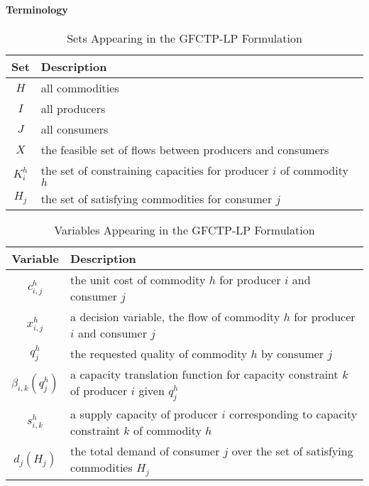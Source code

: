 \paragraph{Terminology}

\begin{table} [h!]
\centering
\begin{tabularx}{\columnwidth-10pt}{|c|X|} %
\hline
Set         & Description \\
\hline
$H$         & all commodities  \\
$I$         & all producers  \\
$J$         & all consumers  \\
$X$         & the feasible set of flows between producers and consumers  \\
$K_{i}^{h}$  & the set of constraining capacities for 
            producer $i$ of commodity $h$  \\
$H_{j}$     & the set of satisfying commodities for consumer $j$  \\
\hline
\end{tabularx}
\caption{Sets Appearing in the GFCTP-LP Formulation}
\label{tbl:GFCTP-LP-sets}
\end{table}

\begin{table} [h!]
\centering
\begin{tabularx}{\columnwidth-10pt}{|c|X|} %
\hline
Variable    & Description \\
\hline
$c_{i,j}^{h}$             & the unit cost of commodity $h$ 
                          for producer $i$ and consumer $j$  \\
$x_{i,j}^{h}$             & a decision variable, the flow of commodity $h$ 
                          for producer $i$ and consumer $j$  \\
$q_{j}^{h}$               & the requested quality of commodity $h$ 
                          by consumer $j$  \\
$\beta_{i,k}(q_{j}^{h})$  & a capacity translation function for capacity 
                          constraint $k$ of producer $i$ given $q_{j}^{h}$ \\
$s_{i,k}^{h}$             & a supply capacity of producer $i$ corresponding to 
                          capacity constraint $k$ of commodity $h$ \\
$d_{j}(H_{j})$            & the total demand of consumer $j$ over the set of 
                          satisfying commodities $H_{j}$ \\
\hline
\end{tabularx}
\caption{Variables Appearing in the GFCTP-LP Formulation}
\label{tbl:GFCTP-LP-vars}
\end{table}

